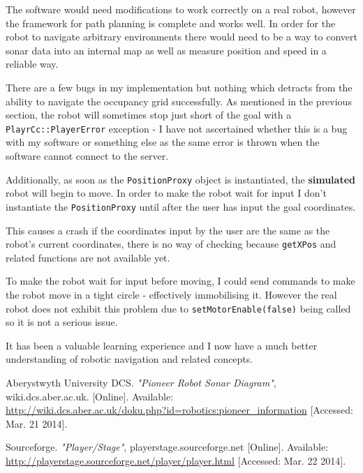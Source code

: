 \documentclass[a4paper,12pt]{article}
\begin{document}
The software would need modifications to work correctly on a real robot, however the framework for path planning is complete and works well. In order for the robot to navigate arbitrary environments there would need to be a way to convert sonar data into an internal map as well as measure position and speed in a reliable way. 

There are a few bugs in my implementation but nothing which detracts from the ability to navigate the occupancy grid successfully. As mentioned in the previous section, the robot will sometimes stop just short of the goal with a \texttt{PlayrCc::PlayerError} exception - I have not ascertained whether this is a bug with my software or something else as the same error is thrown when the software cannot connect to the server.

Additionally, as soon as the \texttt{PositionProxy} object is instantiated, the \textbf{simulated} robot will begin to move. In order to make the robot wait for input I don't instantiate the \texttt{PositionProxy} until after the user has input the goal coordinates. 

This causes a crash if the coordinates input by the user are the same as the robot's current coordinates, there is no way of checking because \texttt{getXPos} and related functions are not available yet. 

To make the robot wait for input before moving, I could send commands to make the robot move in a tight circle - effectively immobilising it. However the real robot does not exhibit this problem due to \texttt{setMotorEnable(false)} being called so it is not a serious issue.

It has been a valuable learning experience and I now have a much better understanding of robotic navigation and related concepts.
\begin{thebibliography}{10}
    Aberystwyth University DCS. \textit{"Pioneer Robot Sonar Diagram"}, wiki.dcs.aber.ac.uk. [Online]. Available:\\ \url{http://wiki.dcs.aber.ac.uk/doku.php?id=robotics:pioneer_information} [Accessed: Mar. 21 2014].

    Sourceforge. \textit{"Player/Stage"}, playerstage.sourceforge.net [Online]. Available:\\ \url{http://playerstage.sourceforge.net/player/player.html} [Accessed: Mar. 22 2014].
    \end{thebibliography}
\end{document}
